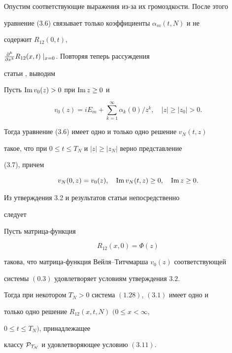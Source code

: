 Опустим соответствующие выражения из-за их громоздкости. После этого 


уравнение (3.6) связывает только коэффициенты $\alpha_m(t,N)$ и не  


содержит $R_{12}(0,t)$, 


$\frac{\partial ^k}{\partial x^k}R_{12}(x,t)\mid_{x=0}$. Повторяя теперь рассуждения 


статьи \cite{6}, выводим 


 


\begin{stats} Пусть $\operatorname{Im} v_0(z)>0$ при $\operatorname{Im} z\ge 0$ и 


$$ 


v_0(z)=i E_m+\sum^\infty_{k=1}\alpha_k(0)/z^k,\quad 


|z|\ge |z_0|>0. 


$$ 


Тогда уравнение (3.6) имеет одно и только одно решение $v_N(t,z)$ 


такое, что при $0\le t\le T_N$ и $|z|\ge|z_N|$ верно представление 


(3.7), причем 


$$ 


v_N(0,z)=v_0(z),\quad \im v_N(t,z)\ge 0,\quad \im z\ge 0. 


$$ 


\end{stats} 


 


Из утверждения 3.2 и результатов статьи \cite{1} непосредственно 


следует 


 


\begin{thms} Пусть матрица-функция 


\begin{equation} 


R_{12}(x,0)=\Phi(z) 


\end{equation} 


такова, что матрица-функция Вейля--Титчмарша $v_0(z)$ соответствующей 


системы $(0.3)$ удовлетворяет условиям утверждения $3.2$. 


Тогда при некотором $T_N>0$ система $(1.28)$, $(3.1)$ имеет одно и 


только одно решение $R_{12}(x,t,N)$ $(0\le x<\infty$, 


$0\le t\le T_N)$, принадлежащее 


классу $\cal P_{T_N}$ и удовлетворяющее условию $(3.11)$.


\end{thms} 


